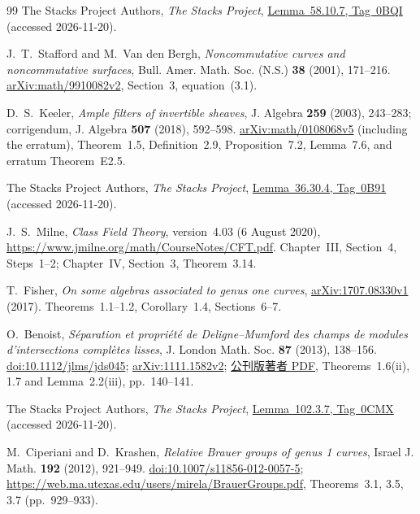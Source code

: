 \begin{thebibliography}{99}
The Stacks Project Authors,
\emph{The Stacks Project},
\href{https://stacks.math.columbia.edu/tag/0BQI}{Lemma~58.10.7, Tag~0BQI}
(accessed 2026-11-20).

J.~T.~Stafford and M.~Van den Bergh,
\emph{Noncommutative curves and noncommutative surfaces},
Bull. Amer. Math. Soc. (N.S.) \textbf{38} (2001), 171--216.
\href{https://arxiv.org/abs/math/9910082v2}{arXiv:math/9910082v2},
Section~3, equation~(3.1).

D.~S.~Keeler,
\emph{Ample filters of invertible sheaves},
J. Algebra \textbf{259} (2003), 243--283;
corrigendum, J. Algebra \textbf{507} (2018), 592--598.
\href{https://arxiv.org/abs/math/0108068v5}{arXiv:math/0108068v5}
(including the erratum), Theorem~1.5, Definition~2.9,
Proposition~7.2, Lemma~7.6, and erratum Theorem~E2.5.

The Stacks Project Authors,
\emph{The Stacks Project},
\href{https://stacks.math.columbia.edu/tag/0B91}{Lemma~36.30.4, Tag~0B91}
(accessed 2026-11-20).

J.~S.~Milne,
\emph{Class Field Theory}, version~4.03 (6 August 2020),
\url{https://www.jmilne.org/math/CourseNotes/CFT.pdf}.
Chapter~III, Section~4, Steps~1--2; Chapter~IV, Section~3, Theorem~3.14.

T.~Fisher,
\emph{On some algebras associated to genus one curves},
\href{https://arxiv.org/abs/1707.08330v1}{arXiv:1707.08330v1} (2017).
Theorems~1.1--1.2, Corollary~1.4, Sections~6--7.

O.~Benoist,
\emph{S\'eparation et propri\'et\'e de Deligne--Mumford des champs de modules
d'intersections compl\`etes lisses},
J. London Math. Soc. \textbf{87} (2013), 138--156.
\href{https://doi.org/10.1112/jlms/jds045}{doi:10.1112/jlms/jds045};
\href{https://arxiv.org/abs/1111.1582v2}{arXiv:1111.1582v2};
\href{https://www.math.ens.psl.eu/~benoist/articles/separticle.pdf}{公刊版著者 PDF},
Theorems~1.6(ii), 1.7 and Lemma~2.2(iii), pp.~140--141.

The Stacks Project Authors,
\emph{The Stacks Project},
\href{https://stacks.math.columbia.edu/tag/0CMX}{Lemma~102.3.7, Tag~0CMX}
(accessed 2026-11-20).

M.~Ciperiani and D.~Krashen,
\emph{Relative Brauer groups of genus 1 curves},
Israel J. Math. \textbf{192} (2012), 921--949.
\href{https://doi.org/10.1007/s11856-012-0057-5}{doi:10.1007/s11856-012-0057-5};
\url{https://web.ma.utexas.edu/users/mirela/BrauerGroups.pdf},
Theorems~3.1, 3.5, 3.7 (pp.~929--933).


\end{thebibliography}
